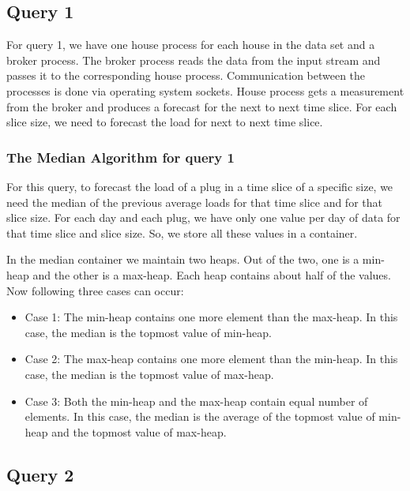 \subsection{Query 1}
For query 1, we have one house process for each house in the data set and a broker process. The broker process reads the data from the input stream and passes it to the corresponding house process. Communication between the processes is done via operating system sockets. House process gets a measurement from the broker and produces a forecast for the next to next time slice.
For each slice size, we need to forecast the load for next to next time slice.
\subsubsection{The Median Algorithm for query 1}
For this query, to forecast the load of a plug in a time slice of a specific size, we need the median of the previous average loads for that time slice and for that slice size. For each day and each plug, we have only one value per day of data for that time slice and slice size. So, we store all these values in a container.

In the median container we maintain two heaps. Out of the two, one is a min-heap and the other is a max-heap. Each heap contains about half of the values. Now following three cases can occur:
\begin{itemize}
\item Case 1: The min-heap contains one more element than the max-heap. In this case, the median is the topmost value of min-heap.
\item Case 2: The max-heap contains one more element than the min-heap. In this case, the median is the topmost value of max-heap.
\item Case 3: Both the min-heap and the max-heap contain equal number of elements. In this case, the median is the average of the topmost value of min-heap and the topmost value of max-heap.

\end{itemize}

\subsection{Query 2}

